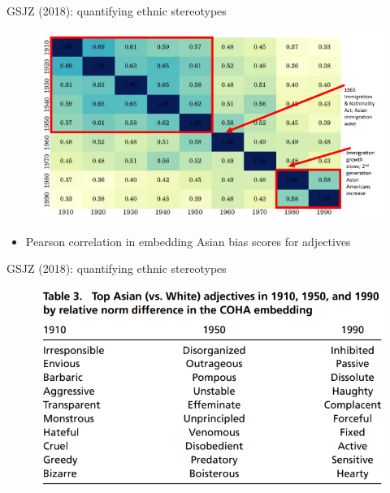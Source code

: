 \documentclass[usenames,dvipsnames,english]{beamer}
\begin{document}
\begin{frame}{GSJZ (2018): quantifying ethnic stereotypes}
\begin{figure}
    \centering
    \includegraphics[scale = 0.6]{Images/gsjz_quantify3.png}
\end{figure}
\begin{itemize}
    \item {\small Pearson correlation in embedding Asian bias scores for adjectives}
\end{itemize}
\end{frame}
\begin{frame}{GSJZ (2018): quantifying ethnic stereotypes}
\begin{figure}
    \centering
    \includegraphics[scale = 0.5]{Images/gsjz_quantify4.png}
\end{figure}
\end{frame}
\end{document}
